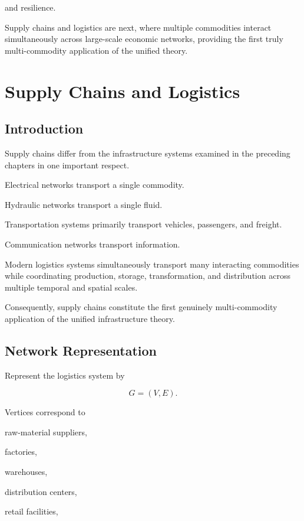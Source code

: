 \documentclass[11pt,fleqn]{book}
\numberwithin{equation}{chapter}
\theoremstyle{plain}
\theoremstyle{definition}
\theoremstyle{remark}
\begin{document}
and resilience.

Supply chains and
logistics are next, where multiple commodities interact simultaneously across
large-scale economic networks, providing the first truly
multi-commodity application of the unified theory.

\chapter{Supply Chains and Logistics}

\section{Introduction}

Supply chains differ from the infrastructure systems examined in the
preceding chapters in one important respect.

Electrical networks transport a single commodity.

Hydraulic networks transport a single fluid.

Transportation systems primarily transport vehicles, passengers, and
freight.

Communication networks transport information.

Modern logistics systems simultaneously transport many interacting
commodities while coordinating production, storage, transformation, and
distribution across multiple temporal and spatial scales.

Consequently, supply chains constitute the first genuinely
multi-commodity application of the unified infrastructure theory.


\section{Network Representation}

Represent the logistics system by

\[
G=(V,E).
\]

Vertices correspond to

raw-material suppliers,

factories,

warehouses,

distribution centers,

retail facilities,
\end{document}
